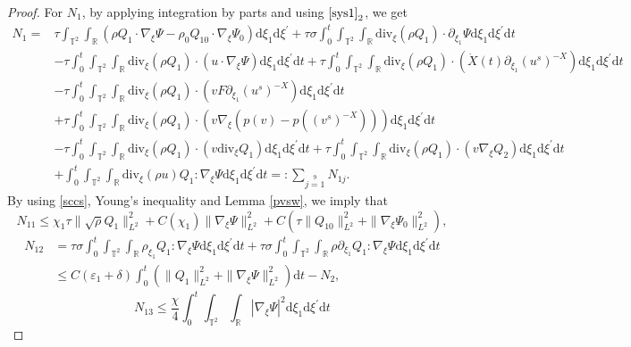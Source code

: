 \documentclass[10pt,reqno]{amsart}
\numberwithin{equation}{section}
\newcommand{\dif}{\mathrm{d}}
\newcommand{\ddiv}{\mathrm{div}}
\begin{document}
\begin{proof}
For $N_1$, by applying integration by parts and using $\eqref{sys1}_2$, we get
\begin{align*}
N_1
=&\tau\int_{\mathbb{T}^2}\int_{\mathbb{R}}
\left(\rho Q_1
\cdot\nabla_\xi\Psi-\rho_0 Q_{10}
\cdot\nabla_\xi\Psi_0\right)\dif \xi_1\dif \xi^{\prime}
+\tau\sigma\int_0^t\int_{\mathbb{T}^2}\int_{\mathbb{R}}
\ddiv_\xi(\rho Q_1)\cdot \partial_{\xi_1}\Psi
\dif \xi_1\dif \xi^{\prime}\dif t\\
&-\tau\int_0^t\int_{\mathbb{T}^2}\int_{\mathbb{R}}
\ddiv_\xi (\rho Q_1)\cdot (u\cdot\nabla_\xi\Psi)
        \dif \xi_1\dif \xi^{\prime}\dif t
+\tau\int_0^t\int_{\mathbb{T}^2}\int_{\mathbb{R}}
  \ddiv_\xi (\rho Q_1)\cdot (\dot{X}(t)\partial_{\xi_1}(u^s)^{-X})
    \dif \xi_1\dif \xi^{\prime}\dif t\\
&-\tau\int_0^t\int_{\mathbb{T}^2}\int_{\mathbb{R}}
      \ddiv_\xi (\rho Q_1)\cdot (vF\partial_{\xi_1}(u^s)^{-X})
        \dif \xi_1\dif \xi^{\prime}\dif t\\
&+\tau\int_0^t\int_{\mathbb{T}^2}\int_{\mathbb{R}}
  \ddiv_\xi (\rho Q_1)\cdot (v\nabla_\xi\left(p(v)-p((v^s)^{-X})\right))
    \dif \xi_1\dif \xi^{\prime}\dif t\\
    &-\tau\int_0^t\int_{\mathbb{T}^2}\int_{\mathbb{R}}
      \ddiv_\xi (\rho Q_1)\cdot (v\ddiv_\xi Q_1)
        \dif \xi_1\dif \xi^{\prime}\dif t
+\tau\int_0^t\int_{\mathbb{T}^2}\int_{\mathbb{R}}
  \ddiv_\xi (\rho Q_1)\cdot (v\nabla_\xi Q_2)
    \dif \xi_1\dif \xi^{\prime}\dif t\\
    &+\int_0^t\int_{\mathbb{T}^2}\int_{\mathbb{R}}
  \ddiv_\xi (\rho u)Q_1:\nabla_\xi\Psi
    \dif \xi_1\dif \xi^{\prime}\dif t
    =:\sum\limits_{j=1}\limits^9N_{1j}.
\end{align*}
 By using \eqref{sccs}, Young's inequality and Lemma \ref{pvsw}, we imply that
\[
N_{11}\le \chi_1\tau\|\sqrt\rho Q_{1}\|_{L^2}^2+C(\chi_1)\|\nabla_\xi\Psi\|_{L^2}^2
+C(\tau\|Q_{10}\|_{L^2}^2+\|\nabla_\xi\Psi_0\|_{L^2}^2),
\]
\begin{align*}
N_{12}&=\tau\sigma\int_0^t\int_{\mathbb{T}^2}\int_{\mathbb{R}}
\rho_{\xi_1}Q_1
:\nabla_\xi\Psi\dif \xi_1\dif \xi^{\prime}\dif t
+\tau\sigma\int_0^t\int_{\mathbb{T}^2}\int_{\mathbb{R}}\rho
\partial_{\xi_1}Q_1
:\nabla_\xi\Psi\dif \xi_1\dif \xi^{\prime}\dif t\\
&\le C(\varepsilon_1+\delta)\int_0^t\left(\| Q_1\|_{L^2}^2+\|\nabla_\xi \Psi\|_{L^2}^2\right)\dif t -N_2,
\end{align*}
\[
N_{13}\le \frac{\chi}{4}\int_0^t\int_{\mathbb{T}^2}\int_{\mathbb{R}}|\nabla_\xi\Psi|^2\dif \xi_1\dif \xi^{\prime}\dif t
\]
\end{proof}
\end{document}
